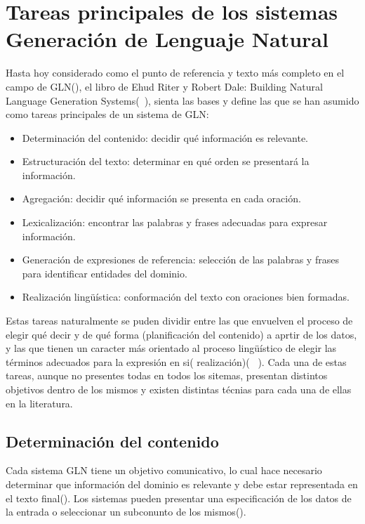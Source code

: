 \section{Tareas principales de los sistemas Generación de Lenguaje Natural}

    Hasta hoy considerado como el punto de referencia y texto más completo en el campo de GLN(\cite{Gatt2018SurveyOT}), el libro de Ehud Riter y
Robert Dale: Building Natural Language Generation Systems(~\cite{reiter_dale_2000}), sienta las bases y define las que se han asumido como tareas principales 
de un sistema de GLN:

\begin{itemize}
    \item Determinación del contenido: decidir qué información es relevante.
    \item Estructuración del texto: determinar en qué orden se presentará la información.
    \item Agregación: decidir qué información se presenta en cada oración.
    \item Lexicalización: encontrar las palabras y frases adecuadas para expresar información.
    \item Generación de expresiones de referencia: selección de las palabras y frases para identificar entidades del dominio.
    \item Realización lingüística: conformación del texto con oraciones bien formadas.
\end{itemize}


Estas tareas naturalmente se puden dividir entre las que envuelven el proceso de elegir qué decir y de qué forma (planificación del contenido) 
a aprtir de los datos, y las que tienen un caracter más orientado al proceso lingüístico de elegir las términos adecuados para la expresión 
en si( realización)( ~\cite{Gatt2018SurveyOT}). Cada una de estas tareas, aunque no presentes todas en todos los sitemas,  presentan distintos 
objetivos dentro de los mismos y existen distintas técnias para cada una de ellas en la literatura.
    
\subsection{Determinación del contenido}

    Cada sistema GLN tiene un objetivo comunicativo, lo cual hace necesario determinar que información del dominio es relevante y debe 
estar representada en el texto final(\cite{reiter_dale_2000}). Los sistemas pueden presentar una especificación de los datos de la entrada 
o seleccionar un subconunto de los mismos(\cite{reiter_dale_2000}).

